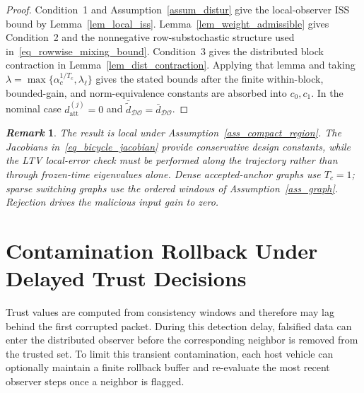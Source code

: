 \documentclass[letterpaper,journal]{IEEEtran}
\def\DO{\mathcal{DO}} %
\newtheorem{remark}{\it Remark}%
\begin{document}
\begin{proof}
Condition~1 and Assumption~\ref{assum_distur} give the local-observer ISS bound by Lemma~\ref{lem_local_iss}. Lemma~\ref{lem_weight_admissible} gives Condition~2 and the nonnegative row-substochastic structure used in~\eqref{eq_rowwise_mixing_bound}. Condition~3 gives the distributed block contraction in Lemma~\ref{lem_dist_contraction}. Applying that lemma and taking $\lambda=\max\{\alpha_c^{1/T_c},\lambda_{\ell}\}$ gives the stated bounds after the finite within-block, bounded-gain, and norm-equivalence constants are absorbed into $c_0,c_1$. In the nominal case $d_{\mathrm{att}}^{(j)}=0$ and $\bar{\tilde d}_{\DO}=\bar d_{\DO}$.
\end{proof}

\begin{remark}
The result is local under Assumption~\ref{ass_compact_region}. The Jacobians in~\eqref{eq_bicycle_jacobian} provide conservative design constants, while the LTV local-error check must be performed along the trajectory rather than through frozen-time eigenvalues alone. Dense accepted-anchor graphs use $T_c=1$; sparse switching graphs use the ordered windows of Assumption~\ref{ass_graph}. Rejection drives the malicious input gain to zero.
\end{remark}

\section{Contamination Rollback Under Delayed Trust Decisions}\label{sec_rollback}
Trust values are computed from consistency windows and therefore may lag behind the first corrupted packet. During this detection delay, falsified data can enter the distributed observer before the corresponding neighbor is removed from the trusted set. To limit this transient contamination, each host vehicle can optionally maintain a finite rollback buffer and re-evaluate the most recent observer steps once a neighbor is flagged.
\end{document}
